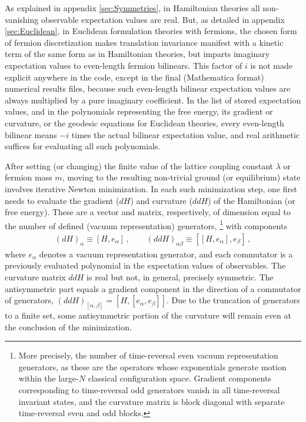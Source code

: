 \documentclass [12pt]{article}
\begin{document}
As explained in appendix \ref{sec:Symmetries},
in Hamiltonian theories
all non-vanishing observable expectation values are real.
But, as detailed in appendix \ref{sec:Euclidean}, in Euclidean formulation
theories with fermions, the chosen form of fermion discretization makes
translation invariance manifest with a kinetic term of the same
form as in Hamiltonian theories, but imparts imaginary expectation
values to even-length fermion bilinears.
This factor of $i$ is not made explicit anywhere in the code,
except in the final (Mathematica format) numerical results files,
because such even-length bilinear expectation values are always
multiplied by a pure imaginary coefficient.
In the list of stored expectation values,
and in
the polynomials representing the free energy, its gradient
or curvature, or the geodesic equations for Euclidean theories,
every even-length bilinear means $-i$ times the actual bilinear
expectation value, and
real arithmetic suffices for evaluating all such polynomials.

After setting (or changing) the finite value of the
lattice coupling constant $\lambda$
or fermion mass $m$,
moving to the resulting non-trivial ground (or equilibrium)
state involves iterative Newton minimization.
In each such minimization step,
one first needs to evaluate the gradient ($dH$) and curvature ($ddH$) of the
Hamiltonian (or free energy).
These are a vector and matrix, respectively, of dimension
equal to the number of defined (vacuum representation) generators,%
\footnote
    {%
    More precisely, the number of time-reversal even 
    vacuum representation generators, as these are the
    operators whose exponentials generate motion within
    the large-$N$ classical configuration space.
    Gradient components corresponding to time-reversal
    odd generators vanish in all time-reversal invariant
    states, and the curvature matrix is block diagonal
    with separate time-reversal even and odd blocks.
    }
with components
\begin{align}
    (dH)_\alpha \equiv [H, e_\alpha] \,,\qquad
    (ddH)_{\alpha\beta} \equiv [ [ H, e_\alpha], e_\beta] \,,
\label{eq:gradcurv}
\end{align}
where $e_\alpha$ denotes 
a vacuum representation generator,
and each commutator is a previously evaluated polynomial in the
expectation values of observables.
The curvature matrix $ddH$ is real but not, in general,
precisely symmetric.
The antisymmetric part equals
a gradient component in the direction of
a commutator of generators,
$
    (ddH)_{[\alpha, \beta]}
    =
    [H, [e_\alpha, e_\beta]]
$.
Due to the truncation of generators to a finite set,
some antisymmetric portion of the curvature will remain even
at the conclusion of the minimization.
%
\end{document}
